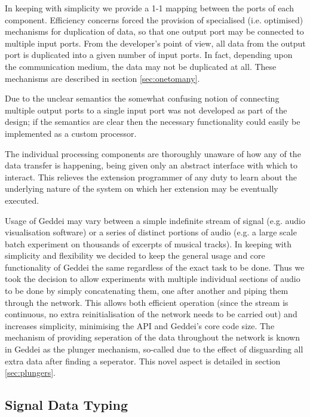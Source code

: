 In keeping with simplicity we provide a 1-1 mapping between the ports of each component. Efficiency concerns forced the provision of specialised (i.e. optimised) mechanisms for duplication of data, so that one output port may be connected to multiple input ports. From the developer's point of view, all data from the output port is duplicated into a given number of input ports. In fact, depending upon the communication medium, the data may not be duplicated at all. These mechanisms are described in section \ref{sec:onetomany}.

Due to the unclear semantics the somewhat confusing notion of connecting multiple output ports to a single input port was not developed as part of the design; if the semantics are clear then the necessary functionality could easily be implemented as a custom processor.

The individual processing components are thoroughly unaware of how any of the data transfer is happening, being given only an abstract interface with which to interact. This relieves the extension programmer of any duty to learn about the underlying nature of the system on which her extension may be eventually executed.

Usage of Geddei may vary between a simple indefinite stream of signal (e.g. audio visualisation software) or a series of distinct portions of audio (e.g. a large scale batch experiment on thousands of excerpts of musical tracks). In keeping with simplicity and flexibility we decided to keep the general usage and core functionality of Geddei the same regardless of the exact task to be done. Thus we took the decision to allow experiments with multiple individual sections of audio to be done by simply concatenating them, one after another and piping them through the network. This allows both efficient operation (since the stream is continuous, no extra reinitialisation of the network needs to be carried out) and increases simplicity, minimising the API and Geddei's core code size. The mechanism of providing seperation of the data throughout the network is known in Geddei as the plunger mechanism, so-called due to the effect of disguarding all extra data after finding a seperator. This novel aspect is detailed in section \ref{sec:plungers}.

\subsection{Signal Data Typing}\label{sec:signaldatatyping}

